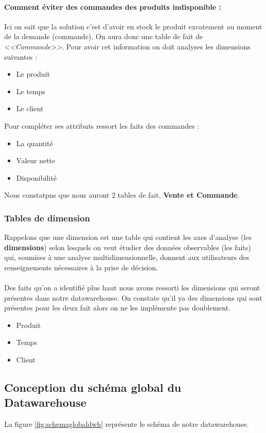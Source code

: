 \paragraph{Comment éviter des commandes des produits indisponible :} Ici on sait que la solution c'est d'avoir en stock le produit excatement au moment de la demande (commande). On aura donc une table de fait de \textit{<<Commande>>}. Pour avoir cet information on doit analyses les dimensions suivantes :
\begin{itemize}
    \item Le produit
    \item Le temps
    \item Le client
\end{itemize}
Pour compléter ses attributs ressort les faits des commandes :
\begin{itemize}
    \item La quantité
    \item Valeur nette
    \item Disponibilité
\end{itemize}

Nous constatpns que nous auront 2 tables de fait, \textbf{Vente et Commande}.



\subsubsection{Tables de dimension}
Rappelons que une dimension est une table qui contient les axes d’analyse (les \textbf{dimensions}) selon lesquels on veut étudier des données observables (les faits) qui, soumises à une analyse multidimensionnelle, donnent aux utilisateurs des renseignements nécessaires à la prise de décision.
\paragraph{}
Des faits qu'on a identifié plus haut nous avons ressorti les dimensions qui seront présentes dans notre datawarehouse. On constate qu'il ya des dimensions qui sont présentes pour les deux fait alors on ne les implémente pas doublement.

\begin{itemize}
    \item Produit
    \item Temps
    \item Client
\end{itemize}


\subsection{Conception du schéma global du Datawarehouse}
La figure \ref{fig:schemaglobaldwh} représente le schéma de notre datawarehouse.

